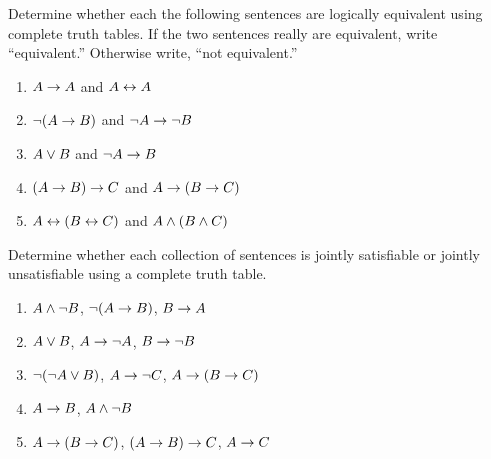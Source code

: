 \problempart
\label{pr.TT.equiv2}
Determine whether each the following sentences are logically equivalent using complete truth tables. If the two sentences really are equivalent, write ``equivalent.'' Otherwise write, ``not equivalent.''
\begin{enumerate}
\item $A\rightarrow A$ and $A \leftrightarrow A$
\item $\neg(A \rightarrow B)$ and $\neg A \rightarrow \neg B$
\item $A \vee B$ and $\neg A \rightarrow B$
\item$(A \rightarrow B) \rightarrow C$ and $A \rightarrow (B \rightarrow C)$
\item $A \leftrightarrow (B \leftrightarrow C)$ and $A \wedge (B \wedge C)$
\end{enumerate}

\problempart
\label{pr.TT.satisfiable2}
Determine whether each collection of sentences is jointly satisfiable or jointly unsatisfiable using a complete truth table.
\begin{enumerate}
\item $A \wedge \neg B$, $\neg(A \rightarrow B)$, $B \rightarrow A$\vspace{.5ex} %
\item $A \vee B$, $A \rightarrow \neg A$, $B \rightarrow \neg B$ \vspace{.5ex}%
\item $\neg(\neg A \vee B) $, $A \rightarrow \neg C$, $A \rightarrow (B \rightarrow C)$\vspace{.5ex} %
\item $A \rightarrow B$, $A \wedge \neg B$\vspace{.5ex} %
\item $A \rightarrow (B \rightarrow C)$, $(A \rightarrow B) \rightarrow C$, $A \rightarrow C$\vspace{.5ex} %
\end{enumerate}

